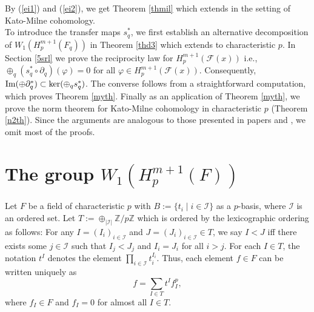 \documentclass[times,10pt]{amsart}
\newcommand{\Z}{\ensuremath{\mathbb{Z}}}
\newcommand{\F}{\ensuremath{\mathcal{F}}}
\newcommand{\I}{\ensuremath{\mathcal{I}}}
\renewcommand{\phi}{\varphi}
\begin{document}
           By (\ref{ei1}) and  (\ref{ei2}),  we get  Theorem \ref{thmil} which  extends  \cite[Theorem 5.3]{Milnor} in the setting of Kato-Milne cohomology. \\
           To introduce the transfer maps $s_q^*$,   we first establish an alternative  decomposition of $W_1(H_p^{m+1}(F_q))$  in Theorem \ref{thd3} which extends  \cite[Theorem 2.3]{Laghribi-Maiti} to characteristic $p$.       In Section \ref{5srl} we prove  the reciprocity law for $H_p^{m+1}(\F(x))$  i.e.,  $\oplus_{q} (s_q^*\circ \partial_q)(\phi)=0$ for all $\phi\in H_p^{m+1}(\F(x))$. Consequently, ${\rm Im}(\oplus \partial_q^*)\subset \ker(\oplus_q s^*_q)$. The  converse follows from a straightforward computation, which proves Theorem \ref{myth}.
             Finally as an application of Theorem \ref{myth}, we prove the norm theorem for Kato-Milne cohomology in characteristic $p$ (Theorem \ref{n2th}). Since the arguments are analogous to those presented in papers \cite{ex} and \cite{Laghribi-Maiti}, we omit most of the proofs.
             

             
    \section{The group $W_1(H_p^{m+1}(F))$}\label{5s2}
    
    Let  $F$ be a field of characteristic $p$ with   $B:=\{ t_i\mid i\in \I\}$  as  a $p$-basis, where $\I$ is an   ordered set.  Let   $T:= \oplus_{|\I|} \Z/p\Z$  \label{b} {which is ordered by the lexicographic ordering as follows: For} any $I= ( I_i)_{i\in \I}$ and $J=(J_i)_{i\in \I}\in T$, we say $I<J$ iff  there exists some $j\in \I$ such that $ I_j<J_j$ and $I_i= J_i$ for all $i>j$. For each  $I\in T$, the notation $t^I$ denotes  the element $\prod_{i\in \I} t_i^{I_i}$. Thus, each element $f\in F$ can be written uniquely as $$  f= \sum_{I\in T} t^I f_I^p,$$ where $f_I\in F$ and $f_I=0$ for {almost all} $I\in T$.
    
\end{document}
